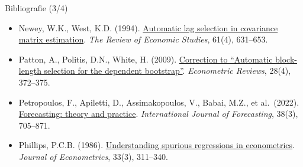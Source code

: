 \begin{frame}{Bibliografie (3/4)}
\begin{itemize}
    \item Newey, W.K., West, K.D. (1994). \href{https://doi.org/10.2307/2297912}{Automatic lag selection in covariance matrix estimation}. \emph{The Review of Economic Studies}, 61(4), 631--653.
    \item Patton, A., Politis, D.N., White, H. (2009). \href{https://doi.org/10.1080/07474930802459016}{Correction to ``Automatic block-length selection for the dependent bootstrap''}. \emph{Econometric Reviews}, 28(4), 372--375.
    \item Petropoulos, F., Apiletti, D., Assimakopoulos, V., Babai, M.Z., et al.\ (2022). \href{https://doi.org/10.1016/j.ijforecast.2021.11.001}{Forecasting: theory and practice}. \emph{International Journal of Forecasting}, 38(3), 705--871.
    \item Phillips, P.C.B. (1986). \href{https://doi.org/10.1016/0304-4076(86)90001-1}{Understanding spurious regressions in econometrics}. \emph{Journal of Econometrics}, 33(3), 311--340.
\end{itemize}
\end{frame}

